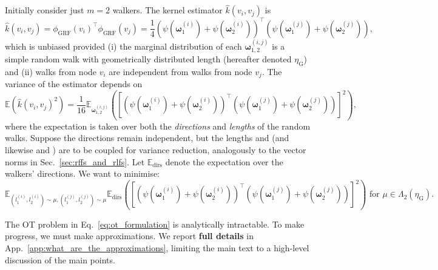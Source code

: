  Initially consider just $m=2$ walkers. 
The kernel estimator $\widehat{k}(v_i,v_j)$ is
\begin{equation}
    \widehat{k}(v_i,v_j) = \phi_\textrm{GRF}(v_i)^\top \phi_\textrm{GRF}(v_j) = \frac{1}{4} \left( \psi( \boldsymbol{\omega}_{1}^{(i)}) + \psi( \boldsymbol{\omega}_{2}^{(i)}) \right)^\top \left( \psi( \boldsymbol{\omega}_{1}^{(j)}) + \psi( \boldsymbol{\omega}_{2}^{(j)}) \right),
\end{equation}
which is unbiased provided (i) the marginal distribution of each $\boldsymbol{\omega}_{1,2}^{(i,j)}$ is a simple random walk with geometrically distributed length (hereafter denoted $\eta_\textrm{G}$) and (ii) walks from node $v_i$ are independent from walks from node $v_j$. 
The variance of the estimator depends on
\begin{equation}
    \mathbb{E}\left( \widehat{k}(v_i,v_j) ^2\right) = \frac{1}{16}  \mathbb{E}_{\boldsymbol{\omega}_{1,2}^{(i,j)}} \left(\left [\left( \psi( \boldsymbol{\omega}_{1}^{(i)}) + \psi( \boldsymbol{\omega}_{2}^{(i)}) \right)^\top \left( \psi( \boldsymbol{\omega}_{1}^{(j)}) + \psi( \boldsymbol{\omega}_{2}^{(j)}) \right) \right]^2 \right),
\end{equation}
where the expectation is taken over both the \emph{directions} and \emph{lengths} of the random walks. 
\vspace{0.5mm}Suppose the directions remain independent, but the lengths  and  (and likewise  and ) are to be coupled for variance reduction, analogously to the vector norms in Sec.~\ref{sec:rffs_and_rlfs}. 
Let $\mathbb{E}_\textrm{dirs}$ denote the expectation over the walkers' directions. 
We want to minimise:
\small
\begin{equation} \label{eq:ot_formulation}
    \mathbb{E}_{(l_1^{(i)},l_2^{(i)}) \sim \mu, (l_1^{(j)},l_2^{(j)}) \sim \mu} \mathbb{E}_\textrm{dirs} \left (  \left [ \left( \psi( \boldsymbol{\omega}_{1}^{(i)}) + \psi( \boldsymbol{\omega}_{2}^{(i)}) \right)^\top \left( \psi( \boldsymbol{\omega}_{1}^{(j)}) + \psi( \boldsymbol{\omega}_{2}^{(j)}) \right) \right]^2 \right) \textrm { for } {\mu \in \Lambda_2(\eta_\textrm{G})}.
\end{equation}
\normalsize

\vspace{-1mm}
The OT problem in Eq.~\ref{eq:ot_formulation} is analytically intractable.
To make progress, we must make approximations.
We report \textbf{full details} in App.~\ref{app:what_are_the_approximations}, limiting the main text to a high-level discussion of the main points.


